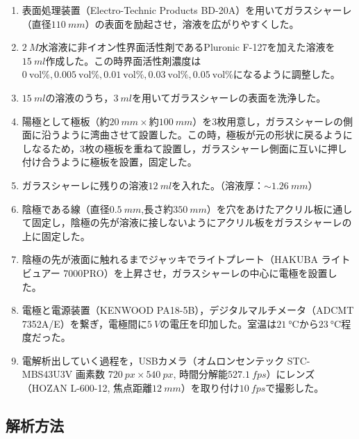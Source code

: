 \documentclass[autodetect-engine,dvi=dvipdfmx,a4paper,ja=standard,oneside,openany,11pt]{bxjsbook}
\begin{document}
\begin{enumerate}
  \item 表面処理装置（Electro-Technic Products BD-20A）を用いてガラスシャーレ（直径$\SI{110}{mm}$）の表面を励起させ，溶液を広がりやすくした。
  \item {} $\SI{2}{M}$水溶液に非イオン性界面活性剤であるPluronic F-127を加えた溶液を$\SI{15}{ml}$作成した。この時界面活性剤濃度は$\SI{0}{\mathrm{vol}\%}, \SI{0.005}{\mathrm{vol}\%}, \SI{0.01}{\mathrm{vol}\%}, \SI{0.03}{\mathrm{vol}\%}, \SI{0.05}{\mathrm{vol}\%}$になるように調整した。
  \item $\SI{15}{ml}$の溶液のうち，$\SI{3}{ml}$を用いてガラスシャーレの表面を洗浄した。
  \item 陽極として極板（約$\SI{20}{mm}\times$約$\SI{100}{mm}$）を3枚用意し，ガラスシャーレの側面に沿うように湾曲させて設置した。この時，極板が元の形状に戻るようにしなるため，3枚の極板を重ねて設置し，ガラスシャーレ側面に互いに押し付け合うように極板を設置，固定した。
  \item ガラスシャーレに残りの溶液$\SI{12}{ml}$を入れた。（溶液厚：$\sim\SI{1.26}{mm}$）
  \item 陰極である線（直径$\SI{0.5}{mm}$,長さ約$\SI{350}{mm}$）を穴をあけたアクリル板に通して固定し，陰極の先が溶液に接しないようにアクリル板をガラスシャーレの上に固定した。
  \item 陰極の先が液面に触れるまでジャッキでライトプレート（HAKUBA ライトビュアー 7000PRO）を上昇させ，ガラスシャーレの中心に電極を設置した。
  \item 電極と電源装置（KENWOOD PA18-5B），デジタルマルチメータ（ADCMT 7352A/E）を繋ぎ，電極間に$\SI{5}{V}$の電圧を印加した。室温は$\SI{21}{\degreeCelsius}$から$\SI{23}{\degreeCelsius}$程度だった。
  \item 電解析出していく過程を，USBカメラ（オムロンセンテック STC-MBS43U3V 画素数 $\SI{720}{px} \times \SI{540}{px}$, 時間分解能$\SI{527.1}{fps}$）にレンズ（HOZAN L-600-12, 焦点距離$\SI{12}{mm}$）を取り付け$\SI{10}{fps}$で撮影した。
\end{enumerate}

\subsection{解析方法}
\end{document}
